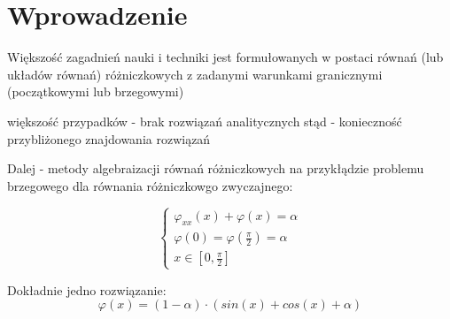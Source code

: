 \section{Wprowadzenie}
	
Większość zagadnień nauki i techniki jest formułowanych w postaci równań (lub układów równań) różniczkowych z zadanymi warunkami granicznymi (początkowymi lub brzegowymi)

większość przypadków - brak rozwiązań analitycznych
stąd - konieczność przybliżonego znajdowania rozwiązań

Dalej - metody algebraizacji równań różniczkowych na przykłądzie problemu brzegowego dla równania różniczkowgo zwyczajnego:

$$
\begin{cases}
	\varphi_{xx}(x) + \varphi(x) = \alpha \\
	\varphi(0) = \varphi(\frac{\pi}{2}) = \alpha \\
	x \in [0,\frac{\pi}{2}]
\end{cases}
$$

Dokładnie jedno rozwiązanie:
$$
\varphi(x) = (1- \alpha) \cdot (sin(x) + cos(x) + \alpha)
$$